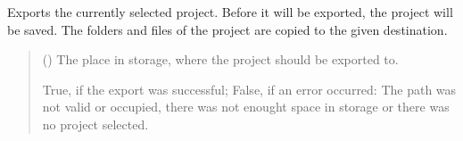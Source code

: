 \documentclass[letterpaper,10pt,english]{sphinxmanual}
\begin{document}
\begin{fulllineitems}
\begin{fulllineitems}
\begin{quote}
\begin{description}
\sphinxAtStartPar
{}

\end{description}\end{quote}

\end{fulllineitems}


\begin{fulllineitems}
\label{\detokenize{apidoc/src.osm_configurator.control:src.osm_configurator.control.control.Control.export_project}}
\pysigstartsignatures
{}
\pysigstopsignatures
\sphinxAtStartPar
Exports the currently selected project.
Before it will be exported, the project will be saved.
The folders and files of the project are copied to the given destination.
\begin{quote}\begin{description}
\sphinxAtStartPar
{} () \textendash{} The place in storage, where the project should be exported to.

\sphinxAtStartPar
True, if the export was successful; False, if an error occurred: The path was not valid or occupied, there was not enought space in storage or there was no project selected.

\sphinxAtStartPar
{}

\end{description}\end{quote}

\end{fulllineitems}



\end{fulllineitems}
\end{document}
